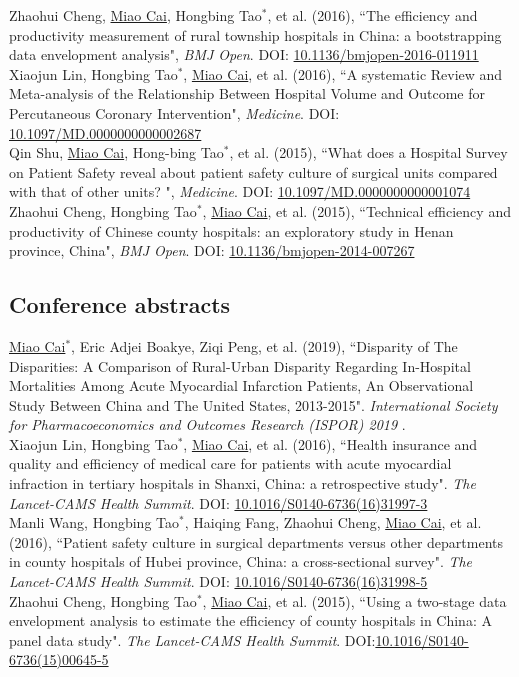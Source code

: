 \documentclass[11pt, a4paper]{article}
\newcommand{\years}[1]{\marginnote{\scriptsize #1}}
\begin{document}
\years{2016}Zhaohui Cheng, \underline{Miao Cai}, Hongbing Tao$^\ast$, et al. (2016), ``The efficiency and productivity measurement of rural township hospitals in China: a bootstrapping data envelopment analysis", \emph{BMJ Open}. DOI: \href{https://doi.org/10.1136/bmjopen-2016-011911}{10.1136/bmjopen-2016-011911}\\
\years{2016}Xiaojun Lin, Hongbing Tao$^\ast$, \underline{Miao Cai}, et al. (2016), ``A systematic Review and Meta-analysis of the Relationship Between Hospital Volume and Outcome for Percutaneous Coronary Intervention", \emph{Medicine}. DOI: \href{https://doi.org/10.1097/MD.0000000000002687}{10.1097/MD.0000000000002687}\\
\years{2015}Qin Shu, \underline{Miao Cai}, Hong-bing Tao$^\ast$, et al. (2015), ``What does a Hospital Survey on Patient Safety reveal about patient safety culture of surgical units compared with that of other units? ", \emph{Medicine}. DOI: \href{https://doi.org/10.1097/MD.0000000000001074}{10.1097/MD.0000000000001074}\\
\years{2015}Zhaohui Cheng, Hongbing Tao$^\ast$, \underline{Miao Cai}, et al. (2015), ``Technical efficiency and productivity of Chinese county hospitals: an exploratory study in Henan province, China", \emph{BMJ Open}. DOI: \href{https://doi.org/10.1136/bmjopen-2014-007267}{10.1136/bmjopen-2014-007267}

\subsection*{Conference abstracts}
\noindent
\years{2019}\underline{Miao Cai$^\ast$}, Eric Adjei Boakye, Ziqi Peng, et al. (2019), ``Disparity of The Disparities: A Comparison of Rural-Urban Disparity Regarding In-Hospital Mortalities Among Acute Myocardial Infarction Patients, An Observational Study Between China and The United States, 2013-2015". \emph{International Society for Pharmacoeconomics and Outcomes Research (ISPOR) 2019 }. \\
\years{2016}Xiaojun Lin, Hongbing Tao$^\ast$, \underline{Miao Cai}, et al. (2016), ``Health insurance and quality and efficiency of medical care for patients with acute myocardial infraction in tertiary hospitals in Shanxi, China: a retrospective study". \emph{The Lancet-CAMS Health Summit}. DOI: \href{https://doi.org/10.1016/S0140-6736(16)31997-3}{10.1016/S0140-6736(16)31997-3}\\
\years{2016}Manli Wang, Hongbing Tao$^\ast$, Haiqing Fang, Zhaohui Cheng, \underline{Miao Cai}, et al. (2016), ``Patient safety culture in surgical departments versus other departments in county hospitals of Hubei province, China: a cross-sectional survey". \emph{The Lancet-CAMS Health Summit}. DOI: \href{https://doi.org/10.1016/S0140-6736(16)31998-5}{10.1016/S0140-6736(16)31998-5}\\
\years{2015}Zhaohui Cheng, Hongbing Tao$^\ast$, \underline{Miao Cai}, et al.  (2015), ``Using a two-stage data envelopment analysis to estimate the efficiency of county hospitals in China: A panel data study". \emph{The Lancet-CAMS Health Summit}. DOI:\href{https://doi.org/10.1016/S0140-6736(15)00645-5}{10.1016/S0140-6736(15)00645-5}
\end{document}
